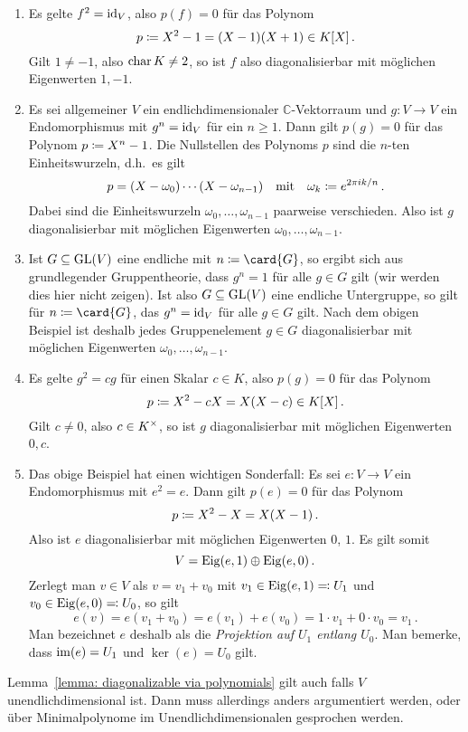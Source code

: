 \begin{example}
  \label{example: diagonalizable via polynomials}
  \leavevmode
  \begin{enumerate}
    \item
      Es gelte $f^2 = \operatorname{id}_V$, also $p(f) = 0$ für das Polynom
      \[
                  p
        \coloneqq  X^2 - 1
        =         (X - 1)(X + 1)
        \in       K[X] \,.
      \]
      Gilt $1 \neq -1$, also $\operatorname{char}{K} \neq 2$, so ist $f$ also diagonalisierbar mit möglichen Eigenwerten $1, -1$.
    \item
      Es sei allgemeiner $V$ ein endlichdimensionaler $\mathbb{C}$-Vektorraum und $g \colon V \to V$ ein Endomorphismus mit $g^n = \operatorname{id}_V$ für ein $n \geq 1$.
      Dann gilt $p(g) = 0$ für das Polynom $p \coloneqq X^n - 1$.
      Die Nullstellen des Polynoms $p$ sind die $n$-ten Einheitswurzeln, d.h.\ es gilt
      \[
        p = (X - \omega_0) \dotsm (X - \omega_{n-1})
        \quad\text{mit}\quad
        \omega_k \coloneqq e^{2 \pi i k / n} \,.
      \]
      Dabei sind die Einheitswurzeln $\omega_0, \dotsc, \omega_{n-1}$ paarweise verschieden.
      Also ist $g$ diagonalisierbar mit möglichen Eigenwerten $\omega_0, \dotsc, \omega_{n-1}$.
    \item
      Ist $G \subseteq \operatorname{GL}(V)$ eine endliche mit $n \defined \card{G}$, so ergibt sich aus grundlegender Gruppentheorie, dass $g^n = 1$ für alle $g \in G$ gilt (wir werden dies hier nicht zeigen).
      Ist also $G \subseteq \operatorname{GL}(V)$ eine endliche Untergruppe, so gilt für $n \defined \card{G}$, das $g^n = \operatorname{id}_V$ für alle $g \in G$ gilt.
      Nach dem obigen Beispiel ist deshalb jedes Gruppenelement $g \in G$ diagonalisierbar mit möglichen Eigenwerten $\omega_0, \dotsc, \omega_{n-1}$.
    \item
      Es gelte $g^2 = cg$ für einen Skalar $c \in K$, also $p(g) = 0$ für das Polynom
      \[
                  p
        \coloneqq  X^2 - cX
        =         X(X-c)
        \in       K[X] \,.
      \]
      Gilt $c \neq 0$, also $c \in K^\times$, so ist $g$ diagonalisierbar mit möglichen Eigenwerten $0, c$.
    \item
      Das obige Beispiel hat einen wichtigen Sonderfall:
      Es sei $e \colon V \to V$ ein Endomorphismus mit $e^2 = e$.
      Dann gilt $p(e) = 0$ für das Polynom
      \[
                  p
        \coloneqq  X^2 - X
        =         X(X-1) \,.
      \]
      Also ist $e$ diagonalisierbar mit möglichen Eigenwerten $0$, $1$.
      Es gilt somit
      \[
        V = \operatorname{Eig}(e, 1) \oplus \operatorname{Eig}(e, 0) \,.
      \]
      Zerlegt man $v \in V$ als $v = v_1 + v_0$ mit $v_1 \in \operatorname{Eig}(e, 1) \eqqcolon U_1$ und $v_0 \in \operatorname{Eig}(e, 0) \eqqcolon U_0$, so gilt
      \[
          e(v)
        = e(v_1 + v_0)
        = e(v_1) + e(v_0)
        = 1 \cdot v_1 + 0 \cdot v_0
        = v_1 \,.
      \]
      Man bezeichnet $e$ deshalb als die \emph{Projektion auf $U_1$ entlang $U_0$}.
      Man bemerke, dass $\operatorname{im}(e) = U_1$ und $\ker(e) = U_0$ gilt.
  \end{enumerate}
\end{example}

\begin{remark}
  Lemma~\ref{lemma: diagonalizable via polynomials} gilt auch falls $V$ unendlichdimensional ist.
  Dann muss allerdings anders argumentiert werden, oder über Minimalpolynome im Unendlichdimensionalen gesprochen werden.
\end{remark}







